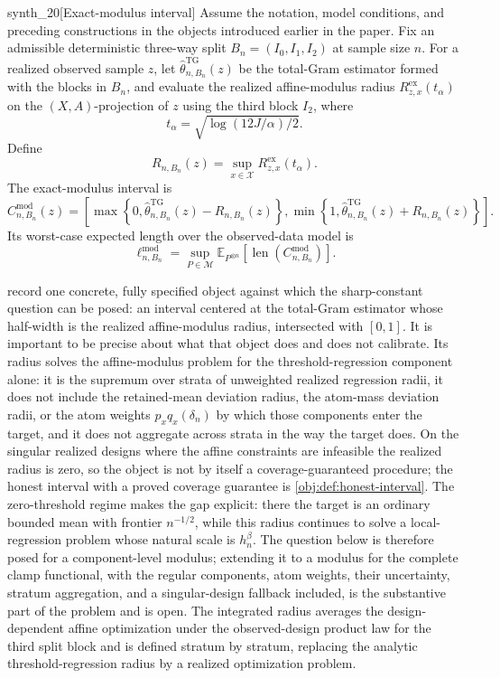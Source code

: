 \begin{definitionv}{synth_20}[Exact-modulus interval]
Assume the notation, model conditions, and preceding constructions in the objects introduced earlier in the paper. Fix an admissible deterministic three-way split \(B_n=(I_0,I_1,I_2)\) at sample size \(n\). For a realized observed sample \(z\), let \(\widehat\theta^{\mathrm{TG}}_{n,B_n}(z)\) be the total-Gram estimator formed with the blocks in \(B_n\), and evaluate the realized affine-modulus radius \(R^{\mathrm{ex}}_{z,x}(t_\alpha)\) on the \((X,A)\)-projection of \(z\) using the third block \(I_2\), where
\[
t_\alpha=\sqrt{\log(12J/\alpha)/2}.
\]
Define
\[
R_{n,B_n}(z)
=
\sup_{x\in\mathcal X}
R^{\mathrm{ex}}_{z,x}(t_\alpha).
\]
The exact-modulus interval is
\[
C^{\mathrm{mod}}_{n,B_n}(z)
=
\left[
\max\left\{0,\widehat\theta^{\mathrm{TG}}_{n,B_n}(z)-R_{n,B_n}(z)\right\},
\min\left\{1,\widehat\theta^{\mathrm{TG}}_{n,B_n}(z)+R_{n,B_n}(z)\right\}
\right].
\]
Its worst-case expected length over the observed-data model is
\[
\ell^{\mathrm{mod}}_{n,B_n}
=
\sup_{P\in\mathcal M}
\mathbb E_{P^{\otimes n}}
\left[
\operatorname{len}\!\left(C^{\mathrm{mod}}_{n,B_n}\right)
\right].
\]
\end{definitionv}

 record one concrete, fully specified object against which the sharp-constant question can be posed: an interval centered at the total-Gram estimator whose half-width is the realized affine-modulus radius, intersected with \([0,1]\).  It is important to be precise about what that object does and does not calibrate.  Its radius solves the affine-modulus problem for the threshold-regression component alone: it is the supremum over strata of unweighted realized regression radii, it does not include the retained-mean deviation radius, the atom-mass deviation radii, or the atom weights \(p_xq_x(\delta_n)\) by which those components enter the target, and it does not aggregate across strata in the way the target does.  On the singular realized designs where the affine constraints are infeasible the realized radius is zero, so the object is not by itself a coverage-guaranteed procedure; the honest interval with a proved coverage guarantee is \cref{obj:def:honest-interval}.  The zero-threshold regime makes the gap explicit: there the target is an ordinary bounded mean with frontier \(n^{-1/2}\), while this radius continues to solve a local-regression problem whose natural scale is \(h_n^\beta\).  The question below is therefore posed for a component-level modulus; extending it to a modulus for the complete clamp functional, with the regular components, atom weights, their uncertainty, stratum aggregation, and a singular-design fallback included, is the substantive part of the problem and is open. The integrated radius averages the design-dependent affine optimization under the observed-design product law for the third split block and is defined stratum by stratum, replacing the analytic threshold-regression radius by a realized optimization problem.

